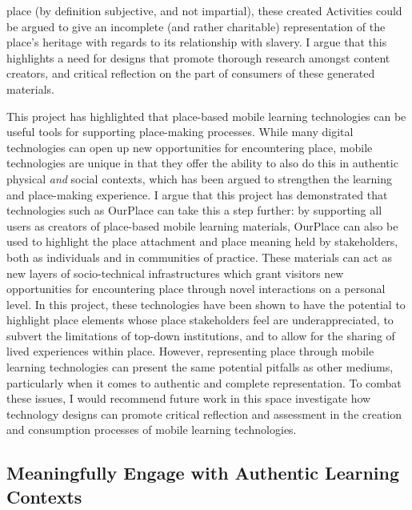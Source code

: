 place (by definition subjective, and not impartial), these created Activities could be argued to give an incomplete (and rather charitable) representation of the place's heritage with regards to its relationship with slavery. I argue that this highlights a need for designs that promote thorough research amongst content creators, and critical reflection on the part of consumers of these generated materials.

This project has highlighted that place-based mobile learning technologies can be useful tools for supporting place-making processes. While many digital technologies can open up new opportunities for encountering place, mobile technologies are unique in that they offer the ability to also do this in authentic physical \textit{and} social contexts, which has been argued to strengthen the learning and place-making experience. I argue that this project has demonstrated that technologies such as OurPlace can take this a step further: by supporting all users as creators of place-based mobile learning materials, OurPlace can also be used to highlight the place attachment and place meaning held by stakeholders, both as individuals and in communities of practice. These materials can act as new layers of socio-technical infrastructures which grant visitors new opportunities for encountering place through novel interactions on a personal level. In this project, these technologies have been shown to have the potential to highlight place elements whose place stakeholders feel are underappreciated, to subvert the limitations of top-down institutions, and to allow for the sharing of lived experiences within place. However, representing place through mobile learning technologies can present the same potential pitfalls as other mediums, particularly when it comes to authentic and complete representation. To combat these issues, I would recommend future work in this space investigate how technology designs can promote critical reflection and assessment in the creation and consumption processes of mobile learning technologies.

\subsection{Meaningfully Engage with Authentic Learning Contexts}

